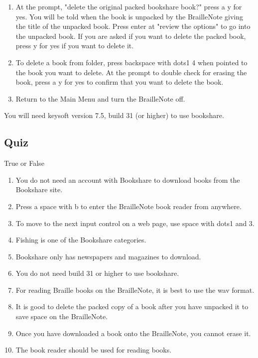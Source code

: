 \documentclass[10pt,letterpaper,twoside]{report}
\begin{document}
{{{\begin{enumerate}
	\item At the prompt, "delete the original packed bookshare book?" press a y for yes.  You will be told when the book is unpacked by the BrailleNote giving the title of the unpacked book.  Press enter at "review the options" to go into the unpacked book.  If you are asked if you want to delete the packed book, press y for yes if you want to delete it.
	\item To delete a book from folder, press backspace with dots1 4 when pointed to the book you want to delete.  At the prompt to double check for erasing the book, press a y for yes to confirm that you want to delete the book.
	\item Return to the Main Menu and turn the BrailleNote off.
\end{enumerate}
You will need keysoft version 7.5, build 31 (or higher) to use bookshare.
\clearpage
\subsection{Quiz}
True or False
\begin{enumerate}
	\item You do not need an account with Bookshare to download books from the Bookshare site.
	\item Press a space with b to enter the BrailleNote book reader from anywhere.
	\item To move to the next input control on a web page, use space with dots1 and 3.
	\item Fishing is one of the Bookshare categories.
	\item Bookshare only has newspapers and magazines to download.
	\item You do not need build 31 or higher to use bookshare.
	\item For reading Braille books on the BrailleNote, it is best to use the wav format.
	\item It is good to delete the packed copy of a book after you have unpacked it to save space on the BrailleNote.
	\item Once you have downloaded a book onto the BrailleNote, you cannot erase it.
	\item The book reader should be used for reading books.
\end{enumerate}
\clearpage
}}}
\end{document}
